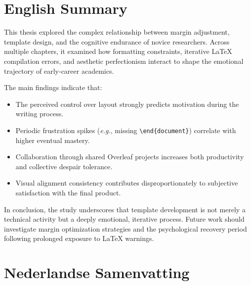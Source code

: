 
\cleardoublepage
\chapter*{English Summary}

This thesis explored the complex relationship between margin adjustment,
template design, and the cognitive endurance of novice researchers.
Across multiple chapters, it examined how formatting constraints,
iterative LaTeX compilation errors, and aesthetic perfectionism interact
to shape the emotional trajectory of early-career academics.

\vspace{1em}
The main findings indicate that:
\begin{itemize}
  \item The perceived control over layout strongly predicts motivation during the writing process.
  \item Periodic frustration spikes (\emph{e.g.}, missing \texttt{\textbackslash end\{document\}}) correlate with higher eventual mastery.
  \item Collaboration through shared Overleaf projects increases both productivity and collective despair tolerance.
  \item Visual alignment consistency contributes disproportionately to subjective satisfaction with the final product.
\end{itemize}

In conclusion, the study underscores that template development is not
merely a technical activity but a deeply emotional, iterative process.
Future work should investigate margin optimization strategies and the
psychological recovery period following prolonged exposure to LaTeX warnings.


\cleardoublepage
\chapter*{Nederlandse Samenvatting}

